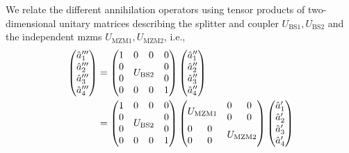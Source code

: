 We relate the different annihilation operators using tensor products of two-dimensional unitary matrices describing the splitter and coupler $U_\text{BS1},U_\text{BS2}$ and the independent \gls{mzm}s $U_\text{MZM1},U_\text{MZM2}$, i.e.,
\begin{equation}
	\begin{split}
		\begin{pmatrix}
			\hat{a}_1^{\prime\prime\prime} \\
			\hat{a}_2^{\prime\prime\prime} \\
			\hat{a}_3^{\prime\prime\prime} \\
			\hat{a}_4^{\prime\prime\prime}
		\end{pmatrix}
		&=
		\begin{pmatrix}
			 1 & 0 & 0 & 0 \\
			 0 & \multicolumn{2}{c}{\multirow{2}{*}{$U_\text{BS2}$}} & 0 \\
			 0 & & & 0 \\
			 0 & 0 & 0 & 1
		\end{pmatrix}
		\begin{pmatrix}
			\hat{a}_1^{\prime\prime} \\
			\hat{a}_2^{\prime\prime} \\
			\hat{a}_3^{\prime\prime} \\
			\hat{a}_4^{\prime\prime}
		\end{pmatrix}
		\\
		&=
		\begin{pmatrix}
			 1 & 0 & 0 & 0 \\
			 0 & \multicolumn{2}{c}{\multirow{2}{*}{$U_\text{BS2}$}} & 0 \\
			 0 & & & 0 \\
			 0 & 0 & 0 & 1
		\end{pmatrix}
		\begin{pmatrix}
			 \multicolumn{2}{c}{\multirow{2}{*}{$U_\text{MZM1}$}} & 0 & 0 \\
			 & & 0 & 0 \\
			 0 & 0 & \multicolumn{2}{c}{\multirow{2}{*}{$U_\text{MZM2}$}} \\
			 0 & 0 & & \\
		\end{pmatrix}
		\begin{pmatrix}
			\hat{a}_1^\prime \\
			\hat{a}_2^\prime \\
			\hat{a}_3^\prime \\
			\hat{a}_4^\prime
		\end{pmatrix}

\end{split}
\end{equation}
